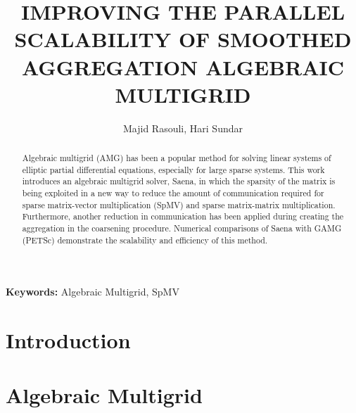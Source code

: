 \documentclass[a4paper,11pt]{article}
\title{\TitleFont\textbf{IMPROVING THE PARALLEL SCALABILITY OF SMOOTHED AGGREGATION ALGEBRAIC MULTIGRID}}
\author{Majid Rasouli, Hari Sundar}
\affil{School of Computing, Univeristy of Utah}
\begin{document}
\maketitle


\begin{abstract}
Algebraic multigrid (AMG) has been a popular method for solving linear systems of elliptic partial differential equations, especially for large sparse systems. This work introduces an algebraic multigrid solver, Saena, in which the sparsity of the matrix is being exploited in a new way to reduce the amount of communication required for sparse matrix-vector multiplication (SpMV) and sparse matrix-matrix multiplication.
Furthermore, another reduction in communication has been applied during creating the aggregation in the coarsening procedure. Numerical comparisons of Saena with GAMG (PETSc) demonstrate the scalability and efficiency of this method.
\end{abstract}

\small{ {\bf Keywords:} Algebraic Multigrid, SpMV}


\section{ \textbf{Introduction} }


\vfill


\section{ \textbf{Algebraic Multigrid} }


\vfill

\end{document}
